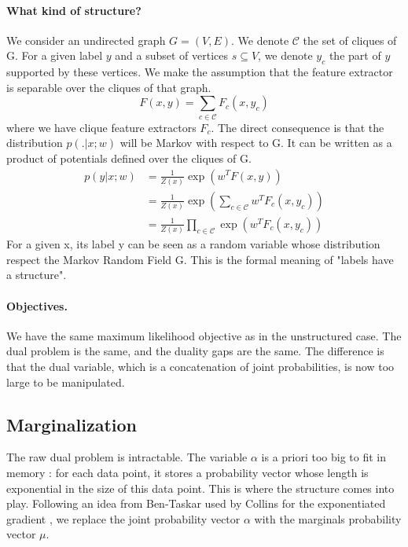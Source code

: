 \documentclass{article}
\DeclareMathOperator{\1}{\mathbb{1}}
\begin{document}
\paragraph{What kind of structure?}
We consider an undirected graph $G=(V,E)$.
We denote $\mathcal{C}$ the set of cliques of G.
For a given label $y$ and a subset of vertices $s \subseteq V$, we denote $y_c$ the part of $y$ supported by these vertices.
We make the assumption that the feature extractor is separable over the cliques of that graph.
\begin{equation}
	F(x, y) =  \sum_{c\in \mathcal{C}} F_c(x, y_c)
\end{equation}
where we have clique feature extractors $F_c$.
The direct consequence is that the distribution $p(. | x ; w)$ will be Markov with respect to G.
It can be written as a product of potentials defined over the cliques of G.
\begin{align*}
	p(y|x ; w)
	& = \frac{1}{Z(x)} \exp(w^TF(x, y)) \\
	& = \frac{1}{Z(x)} \exp( \sum_{c \in \mathcal{C}} w^T F_c(x, y_c))\\
	& = \frac{1}{Z(x)} \prod_{c \in \mathcal{C}} \exp(w^TF_c(x, y_c))
\end{align*}
For a given x, its label y can be seen as a random variable whose distribution respect the Markov Random Field G.
This is the formal meaning of "labels have a structure".


\paragraph{Objectives.}
We have the same maximum likelihood objective as in the unstructured case.
The dual problem is the same, and the duality gaps are the same.
The difference is that the dual variable, which is a concatenation of joint probabilities, is now too large to be manipulated.

\subsection{Marginalization}
The raw dual problem is intractable.
The variable $\alpha$ is a priori too big to fit in memory : for each data point, it stores a probability vector whose length is exponential in the size of this data point.
This is where the structure comes into play.
Following an idea from Ben-Taskar \cite{taskar_max-margin_2004} used by Collins for the exponentiated gradient \cite{collins_exponentiated_2008}, we replace the joint probability vector $\alpha$ with the marginals probability vector $\mu$.
\end{document}
